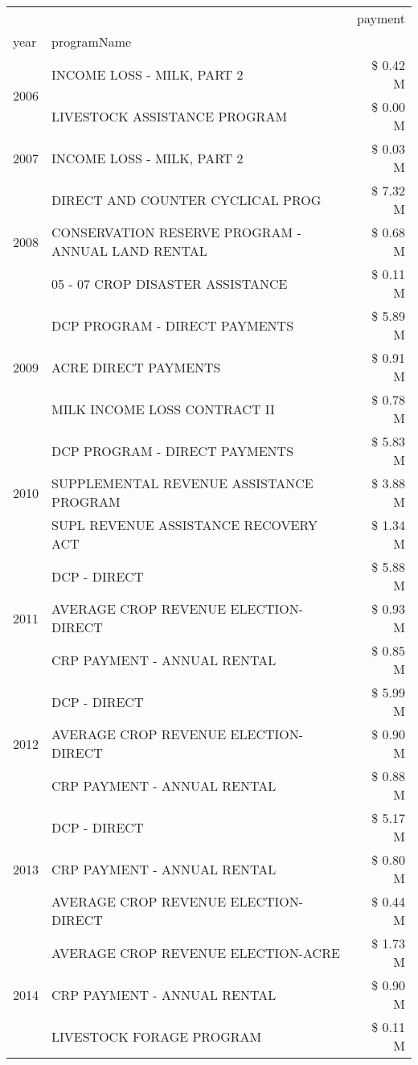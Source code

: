 \begin{tabular}{llr}
\toprule
 &  & payment \\
year & programName &  \\
\midrule
\multirow[t]{2}{*}{2006} & INCOME LOSS - MILK, PART 2 & \$ 0.42 M \\
 & LIVESTOCK ASSISTANCE PROGRAM & \$ 0.00 M \\
\cline{1-3}
2007 & INCOME LOSS - MILK, PART 2 & \$ 0.03 M \\
\cline{1-3}
\multirow[t]{3}{*}{2008} & DIRECT AND COUNTER CYCLICAL PROG & \$ 7.32 M \\
 & CONSERVATION RESERVE PROGRAM - ANNUAL LAND RENTAL & \$ 0.68 M \\
 & 05 - 07 CROP DISASTER ASSISTANCE & \$ 0.11 M \\
\cline{1-3}
\multirow[t]{3}{*}{2009} & DCP PROGRAM - DIRECT PAYMENTS & \$ 5.89 M \\
 & ACRE DIRECT PAYMENTS & \$ 0.91 M \\
 & MILK INCOME LOSS CONTRACT II & \$ 0.78 M \\
\cline{1-3}
\multirow[t]{3}{*}{2010} & DCP PROGRAM - DIRECT PAYMENTS & \$ 5.83 M \\
 & SUPPLEMENTAL REVENUE ASSISTANCE PROGRAM & \$ 3.88 M \\
 & SUPL REVENUE ASSISTANCE RECOVERY ACT & \$ 1.34 M \\
\cline{1-3}
\multirow[t]{3}{*}{2011} & DCP - DIRECT & \$ 5.88 M \\
 & AVERAGE CROP REVENUE ELECTION-DIRECT & \$ 0.93 M \\
 & CRP PAYMENT - ANNUAL RENTAL & \$ 0.85 M \\
\cline{1-3}
\multirow[t]{3}{*}{2012} & DCP - DIRECT & \$ 5.99 M \\
 & AVERAGE CROP REVENUE ELECTION-DIRECT & \$ 0.90 M \\
 & CRP PAYMENT - ANNUAL RENTAL & \$ 0.88 M \\
\cline{1-3}
\multirow[t]{3}{*}{2013} & DCP - DIRECT & \$ 5.17 M \\
 & CRP PAYMENT - ANNUAL RENTAL & \$ 0.80 M \\
 & AVERAGE CROP REVENUE ELECTION-DIRECT & \$ 0.44 M \\
\cline{1-3}
\multirow[t]{3}{*}{2014} & AVERAGE CROP REVENUE ELECTION-ACRE & \$ 1.73 M \\
 & CRP PAYMENT - ANNUAL RENTAL & \$ 0.90 M \\
 & LIVESTOCK FORAGE PROGRAM & \$ 0.11 M \\
\cline{1-3}

\end{tabular}
